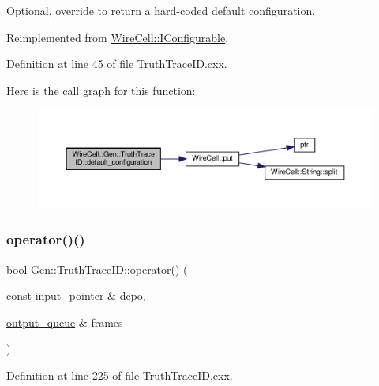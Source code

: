 Optional, override to return a hard-\/coded default configuration. 



Reimplemented from \hyperlink{class_wire_cell_1_1_i_configurable_a54841b2da3d1ea02189478bff96f7998}{Wire\+Cell\+::\+I\+Configurable}.



Definition at line 45 of file Truth\+Trace\+I\+D.\+cxx.

Here is the call graph for this function\+:
\nopagebreak
\begin{figure}[H]
\begin{center}
\leavevmode
\includegraphics[width=350pt]{class_wire_cell_1_1_gen_1_1_truth_trace_i_d_a315b5e6491134d84248cfc2ed8f8e0b1_cgraph}
\end{center}
\end{figure}
\mbox{\label{class_wire_cell_1_1_gen_1_1_truth_trace_i_d_ac96b5f808d28d0197ee9434100f43adc}} 
\subsubsection{\texorpdfstring{operator()()}{operator()()}}
{\footnotesize\ttfamily bool Gen\+::\+Truth\+Trace\+I\+D\+::operator() (\begin{DoxyParamCaption}\item[{const \hyperlink{class_wire_cell_1_1_i_queuedout_node_acf5f716a764553f3c7055a9cf67e906e}{input\+\_\+pointer} \&}]{depo,  }\item[{\hyperlink{class_wire_cell_1_1_i_queuedout_node_a39018e4e3dd886befac9636ac791a685}{output\+\_\+queue} \&}]{frames }\end{DoxyParamCaption})\hspace{0.3cm}{\ttfamily [virtual]}}



Definition at line 225 of file Truth\+Trace\+I\+D.\+cxx.

